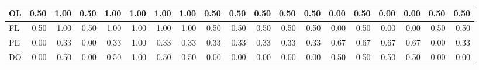 \begin{tabular}[t]{l|r|r|r|r|r|r|r|r|r|r|r|r|r|r|r|r|r|r}
\hline
OL & 0.50 & 1.00 & 0.50 & 1.00 & 1.00 & 1.00 & 1.00 & 0.50 & 0.50 & 0.50 & 0.50 & 0.50 & 0.00 & 0.50 & 0.00 & 0.00 & 0.50 & 0.50\\
\hline
FL & 0.50 & 1.00 & 0.50 & 1.00 & 1.00 & 1.00 & 1.00 & 0.50 & 0.50 & 0.50 & 0.50 & 0.50 & 0.00 & 0.50 & 0.00 & 0.00 & 0.50 & 0.50\\
\hline
PE & 0.00 & 0.33 & 0.00 & 0.33 & 1.00 & 0.33 & 0.33 & 0.33 & 0.33 & 0.33 & 0.33 & 0.33 & 0.67 & 0.67 & 0.67 & 0.67 & 0.00 & 0.33\\
\hline
DO & 0.00 & 0.50 & 0.00 & 0.50 & 1.00 & 0.50 & 0.50 & 0.00 & 0.00 & 0.00 & 0.00 & 0.00 & 0.50 & 0.50 & 0.50 & 0.50 & 0.00 & 0.00\\
\hline
\end{tabular}
